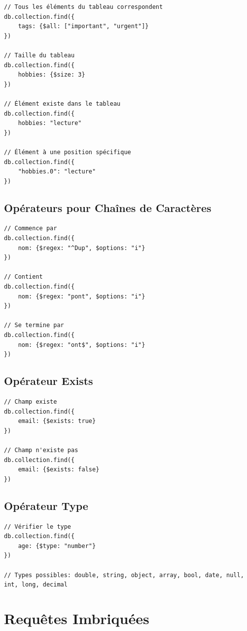 \documentclass[11pt,a4paper]{article}
\begin{document}
\begin{lstlisting}
// Tous les éléments du tableau correspondent
db.collection.find({
    tags: {$all: ["important", "urgent"]}
})

// Taille du tableau
db.collection.find({
    hobbies: {$size: 3}
})

// Élément existe dans le tableau
db.collection.find({
    hobbies: "lecture"
})

// Élément à une position spécifique
db.collection.find({
    "hobbies.0": "lecture"
})
\end{lstlisting}

\subsection{Opérateurs pour Chaînes de Caractères}

\begin{lstlisting}
// Commence par
db.collection.find({
    nom: {$regex: "^Dup", $options: "i"}
})

// Contient
db.collection.find({
    nom: {$regex: "pont", $options: "i"}
})

// Se termine par
db.collection.find({
    nom: {$regex: "ont$", $options: "i"}
})
\end{lstlisting}

\subsection{Opérateur Exists}

\begin{lstlisting}
// Champ existe
db.collection.find({
    email: {$exists: true}
})

// Champ n'existe pas
db.collection.find({
    email: {$exists: false}
})
\end{lstlisting}

\subsection{Opérateur Type}

\begin{lstlisting}
// Vérifier le type
db.collection.find({
    age: {$type: "number"}
})

// Types possibles: double, string, object, array, bool, date, null, int, long, decimal
\end{lstlisting}

\newpage

\section{Requêtes Imbriquées}
\end{document}
